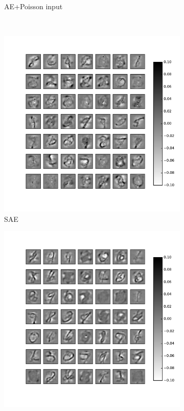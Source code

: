 \begin{figure}
\begin{subfigure}[t]{0.4\textwidth}
		\caption{AE+Poisson input}
	\end{subfigure}\\
	\begin{subfigure}[t]{0.4\textwidth}
		\includegraphics[width=\textwidth]{pics_sdlm/40_MNIST_SAE_original/2_60000_0.pdf}
		\caption{SAE}
	\end{subfigure}
	\begin{subfigure}[t]{0.4\textwidth}
		\includegraphics[width=\textwidth]{pics_sdlm/41_MNIST_SAE_teach/2_60000_0.pdf}

\end{subfigure}
\end{figure}
